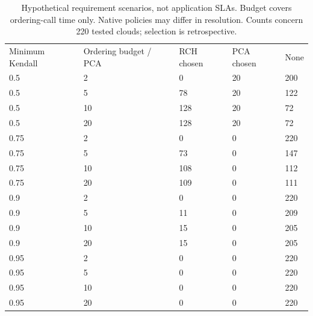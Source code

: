 \begin{table}[tbp]\centering\scriptsize
\caption{Hypothetical requirement scenarios, not application SLAs. Budget covers ordering-call time only. Native policies may differ in resolution. Counts concern 220 tested clouds; selection is retrospective.}
\begin{tabular}{lllll}
\hline
Minimum Kendall & Ordering budget / PCA & RCH chosen & PCA chosen & None \\
0.5 & 2 & 0 & 20 & 200 \\
0.5 & 5 & 78 & 20 & 122 \\
0.5 & 10 & 128 & 20 & 72 \\
0.5 & 20 & 128 & 20 & 72 \\
0.75 & 2 & 0 & 0 & 220 \\
0.75 & 5 & 73 & 0 & 147 \\
0.75 & 10 & 108 & 0 & 112 \\
0.75 & 20 & 109 & 0 & 111 \\
0.9 & 2 & 0 & 0 & 220 \\
0.9 & 5 & 11 & 0 & 209 \\
0.9 & 10 & 15 & 0 & 205 \\
0.9 & 20 & 15 & 0 & 205 \\
0.95 & 2 & 0 & 0 & 220 \\
0.95 & 5 & 0 & 0 & 220 \\
0.95 & 10 & 0 & 0 & 220 \\
0.95 & 20 & 0 & 0 & 220 \\
\hline
\end{tabular}
\end{table}
